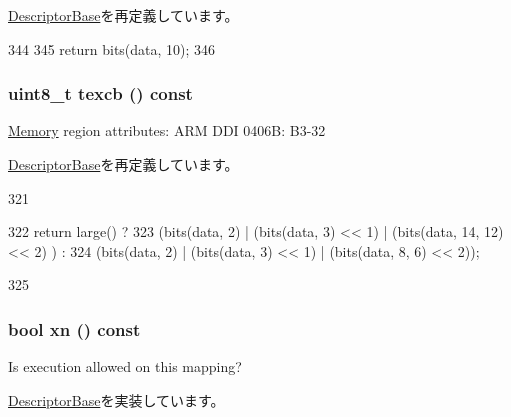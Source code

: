 \hyperlink{classArmISA_1_1TableWalker_1_1DescriptorBase_a2192d5ee6fa7a5fc873e6cdbe8827339}{DescriptorBase}を再定義しています。


\begin{DoxyCode}
344         {
345             return bits(data, 10);
346         }
\end{DoxyCode}
\hypertarget{classArmISA_1_1TableWalker_1_1L2Descriptor_a2f3e1adbe4ca1fa91c6c12f35828dd73}{
\subsubsection[{texcb}]{\setlength{\rightskip}{0pt plus 5cm}uint8\_\-t texcb () const}}
\label{classArmISA_1_1TableWalker_1_1L2Descriptor_a2f3e1adbe4ca1fa91c6c12f35828dd73}
\hyperlink{classArmISA_1_1Memory}{Memory} region attributes: ARM DDI 0406B: B3-\/32 

\hyperlink{classArmISA_1_1TableWalker_1_1DescriptorBase_a7d7e1ce90155279aa511dc49c2b887c2}{DescriptorBase}を再定義しています。


\begin{DoxyCode}
321         {
322             return large() ?
323                 (bits(data, 2) | (bits(data, 3) << 1) | (bits(data, 14, 12) << 2)
      ) :
324                 (bits(data, 2) | (bits(data, 3) << 1) | (bits(data, 8, 6) << 2));
      
325         }
\end{DoxyCode}
\hypertarget{classArmISA_1_1TableWalker_1_1L2Descriptor_a88a5985b2a6224e7b546fa088b101d66}{
\subsubsection[{xn}]{\setlength{\rightskip}{0pt plus 5cm}bool xn () const}}
\label{classArmISA_1_1TableWalker_1_1L2Descriptor_a88a5985b2a6224e7b546fa088b101d66}
Is execution allowed on this mapping? 

\hyperlink{classArmISA_1_1TableWalker_1_1DescriptorBase_a92c5947cbc7259f6e536de82f5b33e4f}{DescriptorBase}を実装しています。


